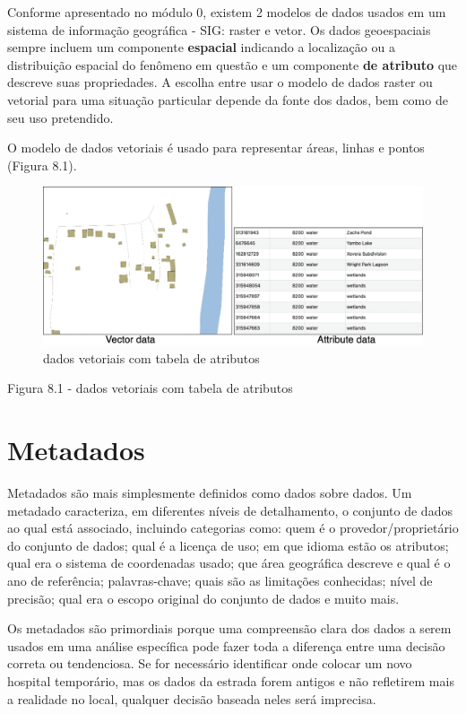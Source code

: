 \documentclass[
]{krantz}
\begin{document}
Conforme apresentado no módulo 0, existem 2 modelos de dados usados \hspace{0pt}\hspace{0pt}em um sistema de informação geográfica - SIG: raster e vetor. Os dados geoespaciais sempre incluem um componente \textbf{espacial} indicando a localização ou a distribuição espacial do fenômeno em questão e um componente \textbf{de atributo} que descreve suas propriedades. A escolha entre usar o modelo de dados raster ou vetorial para uma situação particular depende da fonte dos dados, bem como de seu uso pretendido.

O modelo de dados vetoriais é usado para representar áreas, linhas e pontos (Figura 8.1).

\begin{figure}
\centering
\includegraphics{media/modulo8/fig83.png}
\caption{dados vetoriais com tabela de atributos}
\end{figure}

Figura 8.1 - dados vetoriais com tabela de atributos

\hypertarget{metadados}{%
\section{Metadados}\label{metadados}}

Metadados são mais simplesmente definidos como dados sobre dados. Um metadado caracteriza, em diferentes níveis de detalhamento, o conjunto de dados ao qual está associado, incluindo categorias como: quem é o provedor/proprietário do conjunto de dados; qual é a licença de uso; em que idioma estão os atributos; qual era o sistema de coordenadas usado; que área geográfica descreve e qual é o ano de referência; palavras-chave; quais são as limitações conhecidas; nível de precisão; qual era o escopo original do conjunto de dados e muito mais.

Os metadados são primordiais porque uma compreensão clara dos dados a serem usados \hspace{0pt}\hspace{0pt}em uma análise específica pode fazer toda a diferença entre uma decisão correta ou tendenciosa. Se for necessário identificar onde colocar um novo hospital temporário, mas os dados da estrada forem antigos e não refletirem mais a realidade no local, qualquer decisão baseada neles será imprecisa.
\end{document}

